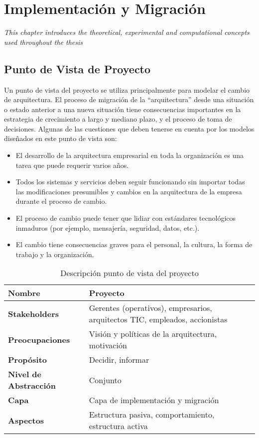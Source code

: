 \chapter{Implementación y Migración}
\label{chap:Implementacion}
\textit{This chapter introduces the theoretical, experimental and computational concepts used throughout the thesis}
\vspace{2ex}\vfill
\minitoc
\newpage

\section{Punto de Vista de Proyecto}
Un punto de vista del proyecto se utiliza principalmente para modelar el cambio de arquitectura. El proceso de migración de la “arquitectura” desde una situación o estado anterior a una nueva situación tiene consecuencias importantes en la estrategia de crecimiento a largo y mediano plazo, y el proceso de toma de decisiones. Algunas de las cuestiones que deben tenerse en cuenta por los modelos diseñados en este punto de vista son:
  
  \begin{itemize}
	\item El desarrollo de la arquitectura empresarial en toda la organización es una tarea que puede requerir varios años.
	\item Todos los sistemas y servicios deben seguir funcionando sin importar todas las modificaciones presumibles y cambios en la arquitectura de la empresa durante el proceso de cambio.
	\item El proceso de cambio puede tener que lidiar con estándares tecnológicos inmaduros (por ejemplo, mensajería, seguridad, datos, etc.).
	\item El cambio tiene consecuencias graves para el personal, la cultura, la forma de trabajo y la organización.
  \end{itemize}

  \begin{table}[H]
	\centering
	\begin{tabular}{p{3.7cm}p{8cm}}
		\hline
		\rowcolor{azull}
		{\color{blancoo} \textbf{Nombre}} & {\color{blancoo} \textbf{Proyecto}} \\
		\hline
		\textbf{Stakeholders} & Gerentes (operativos), empresarios, arquitectos TIC, empleados, accionistas \\
		\textbf{Preocupaciones} & Visión y políticas de la arquitectura, motivación \\
		\textbf{Propósito} & Decidir, informar \\
		\textbf{Nivel de Abstracción} & Conjunto \\
		\textbf{Capa} & Capa de implementación y migración \\
		\textbf{Aspectos} & Estructura pasiva, comportamiento, estructura activa \\
		\bottomrule
	\end{tabular}
	\captionsetup{width=.95\textwidth}
	\caption{Descripción punto de vista del proyecto}
	\label{tabla26}
  \end{table}

